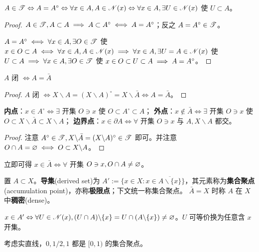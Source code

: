 \begin{theorem}
    $A\in\mathscr T\Leftrightarrow A=A^\circ\Leftrightarrow\forall x\in A,A\in\mathscr N(x)\Leftrightarrow\forall x\in A,\exists U\in\mathscr N(x)$ 使 $U\subset A$。
\end{theorem}

\begin{proof}
    $A\in\mathscr T,A\subset A\implies A\subset A^\circ\iff A=A^\circ$；反之 $A=A^\circ\in\mathscr T$。

    $A=A^\circ\iff\forall x\in A,\exists O\in\mathscr T$ 使 $x\in O\subset A\iff\forall x\in A, A\in\mathscr N(x)\implies \forall x\in A,\exists U=A\in\mathscr N(x)$ 使 $U\subset A\implies \forall x\in A,\exists O\in\mathscr T$ 使 $ x\in O\subset U\subset A \implies A=A^\circ$。
\end{proof}

\begin{theorem}
    $A$ 闭 $\iff A=\bar A$
\end{theorem}
\begin{proof}
    $A$ 闭 $\iff X\backslash A=(X\backslash A)^\circ=X\backslash\bar A\iff A=\bar A$。
\end{proof}

\begin{theorem}
    \textbf{内点}：$x\in A^\circ\iff\exists$ 开集 $O\ni x$ 使 $O\subset A^\circ\subset A$；
    \textbf{外点}：$x\notin \bar A\iff\exists$ 开集 $O\ni x$ 使 $O\subset X\backslash\bar A\subset X\backslash A$；
    \textbf{边界点}：$x\in\partial A\iff\forall$ 开集 $O\ni x$ 与 $A,X\backslash A$ 都交。
\end{theorem}
\begin{proof}
    注意 $A^\circ\in\mathscr T,X\backslash \bar A = (X\backslash A)^\circ\in\mathscr T$ 即可。并注意 $O\cap A=\varnothing\iff O\subset X\backslash A$。
\end{proof}

\begin{remark}
    立即可得 $x\in\bar A\iff\forall$ 开集 $O\ni x,O\cap A\ne\varnothing$。
\end{remark}

\begin{definition}
置 $A\subset X$。\textbf{导集}(derived set)为 $A':=\{x \in X:x\in\overline{A\backslash\{x\}}\}$，其元素称为\textbf{集合聚点}(accumulation point)，亦称\textbf{极限点}；下文统一称集合聚点。
$\bar{A}=X$ 时称 $A$ 在 $X$ 中\textbf{稠密}(dense)。
\end{definition}
\begin{remark}
    $x\in A'\Leftrightarrow \forall U\in\mathscr N(x),(U\cap A)\backslash\{x\}=U\cap (A\backslash\{x\})\ne\varnothing$。$U$ 可等价换为任意含 $x$ 开集。
\end{remark}
\begin{example}
    考虑实直线，$0,1/2,1$ 都是 $[0,1)$ 的集合聚点。
\end{example}


